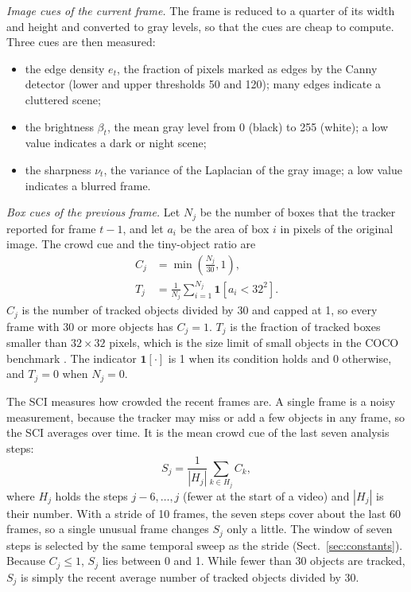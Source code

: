 \documentclass[pdflatex,sn-mathphys-num,iicol]{sn-jnl}
\makeatletter
\def\subsectionfont{\reset@font\fontfamily{\rmdefault}\fontsize{10bp}{12bp}\bfseries\selectfont\raggedright\boldmath}
\renewcommand\subsection{\@startsection{subsection}{2}{\z@}{-7pt \@plus -2pt \@minus -2pt}{3pt}{\subsectionfont}}
\makeatother
\begin{document}
\emph{Image cues of the current frame.} The frame is reduced to a quarter of
its width and height and converted to gray levels, so that the cues are cheap
to compute. Three cues are then measured:
\begin{itemize}
\item the edge density $e_t$, the fraction of pixels marked as edges by the
      Canny detector (lower and upper thresholds 50 and 120); many edges
      indicate a cluttered scene;
\item the brightness $\beta_t$, the mean gray level from 0 (black) to 255
      (white); a low value indicates a dark or night scene;
\item the sharpness $\nu_t$, the variance of the Laplacian of the gray image;
      a low value indicates a blurred frame.
\end{itemize}

\emph{Box cues of the previous frame.} Let $N_j$ be the number of boxes that
the tracker reported for frame $t-1$, and let $a_i$ be the area of box $i$ in
pixels of the original image. The crowd cue and the tiny-object ratio are
\begin{align}
C_j&=\min\!\left(\frac{N_j}{30},1\right),\label{eq:crowd}\\
T_j&=\frac{1}{N_j}\sum_{i=1}^{N_j}\mathbf{1}\!\left[a_i<32^2\right].\label{eq:tiny}
\end{align}
$C_j$ is the number of tracked objects divided by 30 and capped at 1, so every
frame with 30 or more objects has $C_j=1$. $T_j$ is the fraction of tracked
boxes smaller than $32\times32$ pixels, which is the size limit of small
objects in the COCO benchmark \cite{lin2014coco}. The indicator
$\mathbf{1}[\cdot]$ is 1 when its condition holds and 0 otherwise, and $T_j=0$
when $N_j=0$.

\subsection{SCI and scene label}\label{sec:sci}
The SCI measures how crowded the recent frames are.
A single frame is a noisy measurement, because the tracker may miss or add a
few objects in any frame, so the SCI averages over time. It is the mean crowd
cue of the last seven analysis steps:
\begin{equation}
S_j=\frac{1}{|H_j|}\sum_{k\in H_j} C_k,
\label{eq:sci}
\end{equation}
where $H_j$ holds the steps $j-6,\dots,j$ (fewer at the start of a video) and
$|H_j|$ is their number. With a stride of 10 frames, the seven steps cover
about the last 60 frames, so a single unusual frame changes $S_j$ only a little. The
window of seven steps is selected by the same temporal sweep as the stride
(Sect.~\ref{sec:constants}). Because $C_j\le1$, $S_j$ lies between 0 and 1.
While fewer than 30 objects are tracked, $S_j$ is simply the recent average
number of tracked objects divided by 30.
\end{document}
